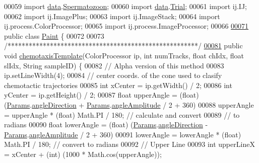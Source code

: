 \begin{DoxyCode}
00059 \textcolor{keyword}{import} \hyperlink{namespacedata}{data}.\hyperlink{classdata_1_1_spermatozoon}{Spermatozoon};
00060 \textcolor{keyword}{import} \hyperlink{namespacedata}{data}.\hyperlink{classdata_1_1_trial}{Trial};
00061 \textcolor{keyword}{import} ij.IJ;
00062 \textcolor{keyword}{import} ij.ImagePlus;
00063 \textcolor{keyword}{import} ij.ImageStack;
00064 \textcolor{keyword}{import} ij.process.ColorProcessor;
00065 \textcolor{keyword}{import} ij.process.ImageProcessor;
00066 
\hypertarget{_paint_8java_source_l00071}{}\hyperlink{classfunctions_1_1_paint}{00071} \textcolor{keyword}{public} \textcolor{keyword}{class }\hyperlink{classfunctions_1_1_paint}{Paint} \{
00072 
00073   \textcolor{comment}{/******************************************************/}
\hypertarget{_paint_8java_source_l00081}{}\hyperlink{classfunctions_1_1_paint_aaec84e76dfa781152d5fb9ba9c2a46a4}{00081}   \textcolor{keyword}{public} \textcolor{keywordtype}{void} \hyperlink{classfunctions_1_1_paint_aaec84e76dfa781152d5fb9ba9c2a46a4}{chemotaxisTemplate}(ColorProcessor ip, \textcolor{keywordtype}{int} numTracks, \textcolor{keywordtype}{float} chIdx, \textcolor{keywordtype}{float} 
      slIdx, String sampleID) \{
00082     \textcolor{comment}{// Alpha version of this method}
00083     ip.setLineWidth(4);
00084     \textcolor{comment}{// center coords. of the cone used to clasify chemotactic trajectories}
00085     \textcolor{keywordtype}{int} xCenter = ip.getWidth() / 2;
00086     \textcolor{keywordtype}{int} yCenter = ip.getHeight() / 2;
00087     \textcolor{keywordtype}{float} upperAngle = (float) (\hyperlink{classdata_1_1_params}{Params}.\hyperlink{classdata_1_1_params_a11ad187f45e1f7add56bde4071bfdf74}{angleDirection} + 
      \hyperlink{classdata_1_1_params}{Params}.\hyperlink{classdata_1_1_params_a42568ad774d8f4ccb9535aeda39fc883}{angleAmplitude} / 2 + 360) %
00088     upperAngle = upperAngle * (float) Math.PI / 180; \textcolor{comment}{// calculate and convert}
00089                                                      \textcolor{comment}{// to radians}
00090     \textcolor{keywordtype}{float} lowerAngle = (\textcolor{keywordtype}{float}) (\hyperlink{classdata_1_1_params}{Params}.\hyperlink{classdata_1_1_params_a11ad187f45e1f7add56bde4071bfdf74}{angleDirection} - 
      \hyperlink{classdata_1_1_params}{Params}.\hyperlink{classdata_1_1_params_a42568ad774d8f4ccb9535aeda39fc883}{angleAmplitude} / 2 + 360) %
00091     lowerAngle = lowerAngle * (float) Math.PI / 180; \textcolor{comment}{// convert to radians}
00092     \textcolor{comment}{// Upper Line}
00093     \textcolor{keywordtype}{int} upperLineX = xCenter + (\textcolor{keywordtype}{int}) (1000 * Math.cos(upperAngle));

\end{DoxyCode}
